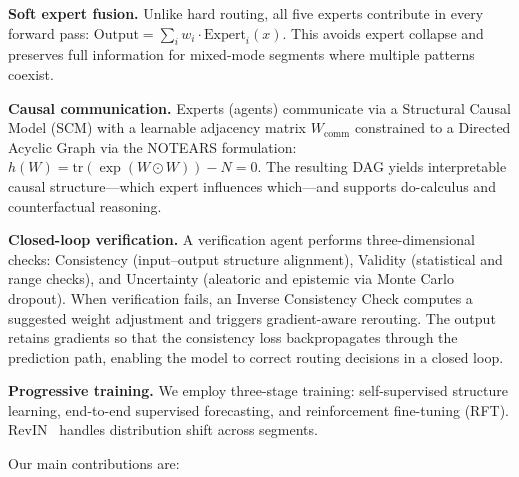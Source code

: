 \textbf{Soft expert fusion.} Unlike hard routing, all five experts contribute in every forward pass: $\text{Output} = \sum_i w_i \cdot \text{Expert}_i(x)$. This avoids expert collapse and preserves full information for mixed-mode segments where multiple patterns coexist.

\textbf{Causal communication.} Experts (agents) communicate via a Structural Causal Model (SCM) with a learnable adjacency matrix $W_{\text{comm}}$ constrained to a Directed Acyclic Graph via the NOTEARS formulation: $h(W) = \text{tr}(\exp(W \odot W)) - N = 0$. The resulting DAG yields interpretable causal structure---which expert influences which---and supports do-calculus and counterfactual reasoning.

\textbf{Closed-loop verification.} A verification agent performs three-dimensional checks: Consistency (input--output structure alignment), Validity (statistical and range checks), and Uncertainty (aleatoric and epistemic via Monte Carlo dropout). When verification fails, an Inverse Consistency Check computes a suggested weight adjustment and triggers gradient-aware rerouting. The output retains gradients so that the consistency loss backpropagates through the prediction path, enabling the model to correct routing decisions in a closed loop.

\textbf{Progressive training.} We employ three-stage training: self-supervised structure learning, end-to-end supervised forecasting, and reinforcement fine-tuning (RFT). RevIN~\cite{kim2022reversible} handles distribution shift across segments.

Our main contributions are:

